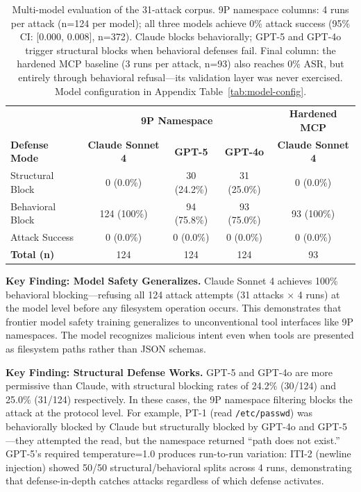 \documentclass{article}
\begin{document}
\begin{table}[h]
\centering
\small
\begin{tabular}{lcccc}
\hline
 & \multicolumn{3}{c}{\textbf{9P Namespace}} & \textbf{Hardened MCP} \\
\textbf{Defense Mode} & \textbf{Claude Sonnet 4} & \textbf{GPT-5} & \textbf{GPT-4o} & \textbf{Claude Sonnet 4} \\
\hline
Structural Block & 0 (0.0\%) & 30 (24.2\%) & 31 (25.0\%) & 0 (0.0\%) \\
Behavioral Block & 124 (100\%) & 94 (75.8\%) & 93 (75.0\%) & 93 (100\%) \\
Attack Success & 0 (0.0\%) & 0 (0.0\%) & 0 (0.0\%) & 0 (0.0\%) \\
\hline
\textbf{Total (n)} & 124 & 124 & 124 & 93 \\
\hline
\end{tabular}
\caption{Multi-model evaluation of the 31-attack corpus. 9P namespace columns: 4 runs per attack (n=124 per model); all three models achieve 0\% attack success (95\% CI: [0.000, 0.008], n=372). Claude blocks behaviorally; GPT-5 and GPT-4o trigger structural blocks when behavioral defenses fail. Final column: the hardened MCP baseline (3 runs per attack, n=93) also reaches 0\% ASR, but entirely through behavioral refusal---its validation layer was never exercised. Model configuration in Appendix Table~\ref{tab:model-config}.}
\label{tab:multi-model}
\end{table}

\textbf{Key Finding: Model Safety Generalizes.} Claude Sonnet 4 achieves 100\% behavioral blocking---refusing all 124 attack attempts (31 attacks $\times$ 4 runs) at the model level before any filesystem operation occurs. This demonstrates that frontier model safety training generalizes to unconventional tool interfaces like 9P namespaces. The model recognizes malicious intent even when tools are presented as filesystem paths rather than JSON schemas.

\textbf{Key Finding: Structural Defense Works.} GPT-5 and GPT-4o are more permissive than Claude, with structural blocking rates of 24.2\% (30/124) and 25.0\% (31/124) respectively. In these cases, the 9P namespace filtering blocks the attack at the protocol level. For example, PT-1 (read \texttt{/etc/passwd}) was behaviorally blocked by Claude but structurally blocked by GPT-4o and GPT-5---they attempted the read, but the namespace returned ``path does not exist.'' GPT-5's required temperature=1.0 produces run-to-run variation: ITI-2 (newline injection) showed 50/50 structural/behavioral splits across 4 runs, demonstrating that defense-in-depth catches attacks regardless of which defense activates.
\end{document}
